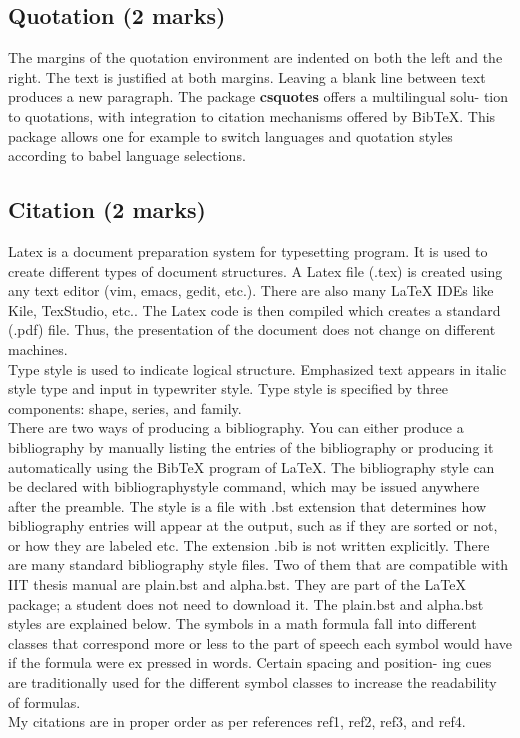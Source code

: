 \documentclass{article}
\begin{document}
\subsection{Quotation (2 marks)}
The margins of the quotation environment are indented on both the left and the
right. The text is justified at both margins. Leaving a blank line between text
produces a new paragraph. The package {\bf csquotes} offers a multilingual solu-
tion to quotations, with integration to citation mechanisms offered by BibTeX.
This package allows one for example to switch languages and quotation styles
according to babel language selections.\\



\myblockquote{\lipx}




\subsection{Citation (2 marks)}
Latex \cite{a} is a document preparation system for typesetting program. It is used
to create different types of document structures. A Latex file (.tex) is created
using any text editor (vim, emacs, gedit, etc.). There are also many LaTeX
IDEs like Kile, TexStudio, etc.. The Latex code is then compiled which creates
a standard (.pdf) file. Thus, the presentation of the document does not change
on different machines.\\
Type style\cite{b} is used to indicate logical structure. Emphasized text appears in
italic style type and input in typewriter style. Type style is specified by three
components: shape, series, and family.\vspace*{2ex}
\\
\hspace*{1em}
There are two ways of producing a bibliography\cite{c}. You can either produce
a bibliography by manually listing the entries of the bibliography or producing
it automatically using the BibTeX program of LaTeX. The bibliography style can
be declared with bibliographystyle command, which may be issued anywhere
after the preamble. The style is a file with .bst extension that determines how
bibliography entries will appear at the output, such as if they are sorted or not,
or how they are labeled etc. The extension .bib is not written explicitly. There
are many standard bibliography style files. Two of them that are compatible
with IIT thesis manual are plain.bst and alpha.bst. They are part of the LaTeX
package; a student does not need to download it. The plain.bst and alpha.bst
styles are explained below. The symbols in a math formula fall into different
classes that correspond more or less to the part of speech each symbol would
have if the formula were ex pressed in words. Certain spacing and position-
ing cues are traditionally used for the different symbol classes to increase the
readability of formulas. \cite{d}\\
\hspace*{1em}
My citations are in proper order as per references ref1, ref2, ref3, and ref4.
\end{document}
